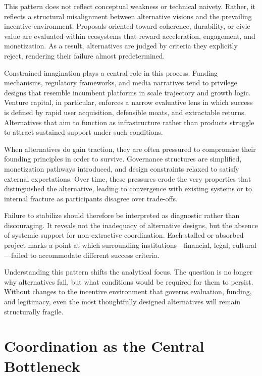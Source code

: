 \documentclass[12pt]{article}
\begin{document}
This pattern does not reflect conceptual weakness or technical naivety. Rather, it reflects a structural misalignment between alternative visions and the prevailing incentive environment. Proposals oriented toward coherence, durability, or civic value are evaluated within ecosystems that reward acceleration, engagement, and monetization. As a result, alternatives are judged by criteria they explicitly reject, rendering their failure almost predetermined.

Constrained imagination plays a central role in this process. Funding mechanisms, regulatory frameworks, and media narratives tend to privilege designs that resemble incumbent platforms in scale trajectory and growth logic. Venture capital, in particular, enforces a narrow evaluative lens in which success is defined by rapid user acquisition, defensible moats, and extractable returns. Alternatives that aim to function as infrastructure rather than products struggle to attract sustained support under such conditions.

When alternatives do gain traction, they are often pressured to compromise their founding principles in order to survive. Governance structures are simplified, monetization pathways introduced, and design constraints relaxed to satisfy external expectations. Over time, these pressures erode the very properties that distinguished the alternative, leading to convergence with existing systems or to internal fracture as participants disagree over trade-offs.

Failure to stabilize should therefore be interpreted as diagnostic rather than discouraging. It reveals not the inadequacy of alternative designs, but the absence of systemic support for non-extractive coordination. Each stalled or absorbed project marks a point at which surrounding institutions—financial, legal, cultural—failed to accommodate different success criteria.

Understanding this pattern shifts the analytical focus. The question is no longer why alternatives fail, but what conditions would be required for them to persist. Without changes to the incentive environment that governs evaluation, funding, and legitimacy, even the most thoughtfully designed alternatives will remain structurally fragile.

\section{Coordination as the Central Bottleneck}
\end{document}
